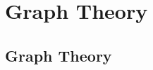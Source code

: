 \documentclass[../alevelmaths.tex]{subfiles}
\begin{document}
\chapter{Graph Theory}
\section{Graph Theory}
\end{document}
